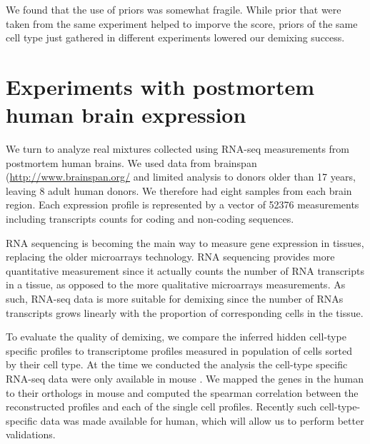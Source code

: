 We found that the use of priors was somewhat fragile. While prior that were taken from the same experiment helped to imporve the score, priors of the same cell type just gathered in different experiments lowered our demixing success. 

\section{Experiments with postmortem human brain expression}
\label{Human_exp}

We turn to analyze real mixtures collected using RNA-seq measurements from postmortem human brains. We used data from brainspan \cite{brainspan} (\url{http://www.brainspan.org/} and limited analysis to donors older than 17 years, leaving 8 adult human donors. We therefore had eight samples from each brain region. Each expression profile is represented by a vector of 52376 measurements including transcripts counts for coding and non-coding sequences. 


RNA sequencing is becoming the main way to measure gene expression in tissues, replacing the older microarrays technology. RNA sequencing provides more quantitative measurement since it actually counts the number of RNA transcripts in a tissue, as opposed to the more qualitative microarrays measurements. As such, RNA-seq data is more suitable for demixing since the number of RNAs transcripts grows linearly with the proportion of corresponding cells in the tissue.

To evaluate the quality of demixing, we compare the inferred hidden cell-type specific profiles to transcriptome profiles measured in population of cells sorted by their cell type. At the time we conducted the analysis the cell-type specific RNA-seq data were only available in mouse \cite{barres2014}. We mapped the genes in the human to their orthologs in mouse and computed the spearman correlation between the reconstructed profiles and each of the single cell profiles. Recently such cell-type-specific data was made available for human, which will allow us to perform better validations. 

